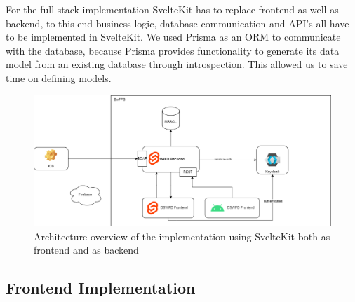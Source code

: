 For the full stack implementation SvelteKit has to replace frontend as well as backend, to this end business logic, database communication and API's all have to be implemented in SvelteKit. We used Prisma \cite{noauthor_prisma_nodate} as an ORM to communicate with the database, because Prisma provides functionality to generate its data model from an existing database through introspection. This allowed us to save time on defining models. 


\begin{figure}[ht]
    \centering
    \includegraphics[width=.8\linewidth]{assets/dswfd-architecture-fullstack}
    \caption{Architecture overview of the implementation using SvelteKit both as frontend and as backend}
    \label{fig:dswfd-architecture-fullstack}
\end{figure}

\subsection{Frontend Implementation}

          

